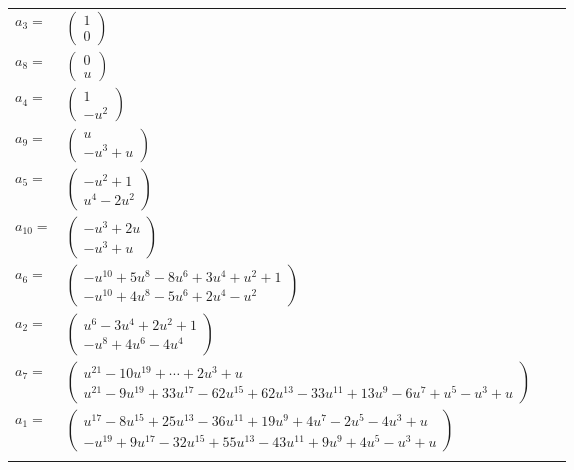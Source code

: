 \documentclass[1p]{elsarticle_modified}
\theoremstyle{definition}
\begin{document}
\begin{tabular}{m{7pt} m{180pt} m{7pt} m{180pt} }
\flushright $a_{3}=$&$\begin{pmatrix}1\\0\end{pmatrix}$ \\
\flushright $a_{8}=$&$\begin{pmatrix}0\\u\end{pmatrix}$ \\
\flushright $a_{4}=$&$\begin{pmatrix}1\\- u^2\end{pmatrix}$ \\
\flushright $a_{9}=$&$\begin{pmatrix}u\\- u^3+u\end{pmatrix}$ \\
\flushright $a_{5}=$&$\begin{pmatrix}- u^2+1\\u^4-2 u^2\end{pmatrix}$ \\
\flushright $a_{10}=$&$\begin{pmatrix}- u^3+2 u\\- u^3+u\end{pmatrix}$ \\
\flushright $a_{6}=$&$\begin{pmatrix}- u^{10}+5 u^8-8 u^6+3 u^4+u^2+1\\- u^{10}+4 u^8-5 u^6+2 u^4- u^2\end{pmatrix}$ \\
\flushright $a_{2}=$&$\begin{pmatrix}u^6-3 u^4+2 u^2+1\\- u^8+4 u^6-4 u^4\end{pmatrix}$ \\
\flushright $a_{7}=$&$\begin{pmatrix}u^{21}-10 u^{19}+\cdots+2 u^3+u\\u^{21}-9 u^{19}+33 u^{17}-62 u^{15}+62 u^{13}-33 u^{11}+13 u^9-6 u^7+u^5- u^3+u\end{pmatrix}$ \\
\flushright $a_{1}=$&$\begin{pmatrix}u^{17}-8 u^{15}+25 u^{13}-36 u^{11}+19 u^9+4 u^7-2 u^5-4 u^3+u\\- u^{19}+9 u^{17}-32 u^{15}+55 u^{13}-43 u^{11}+9 u^9+4 u^5- u^3+u\end{pmatrix}$\\&\end{tabular}
\end{document}
